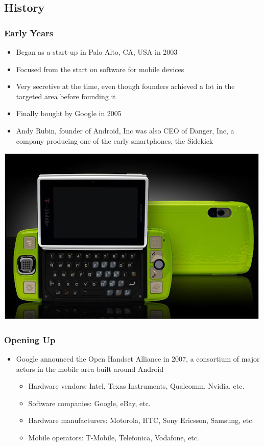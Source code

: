 \subsection{History}
\begin{frame}
  \frametitle{Early Years}
  \begin{itemize}
  \item Began as a start-up in Palo Alto, CA, USA in 2003
  \item Focused from the start on software for mobile devices
  \item Very secretive at the time, even though founders achieved a
    lot in the targeted area before founding it
  \item Finally bought by Google in 2005
  \item Andy Rubin, founder of Android, Inc was also CEO of Danger,
    Inc, a company producing one of the early smartphones, the
    Sidekick
  \end{itemize}
  \begin{center}
    \includegraphics[height=0.4\textheight]{slides/android-introduction-history/sidekick.jpg}
  \end{center}
\end{frame}

\begin{frame}
  \frametitle{Opening Up}
  \begin{itemize}
  \item Google announced the Open Handset Alliance in 2007, a
    consortium of major actors in the mobile area built around Android
    \begin{itemize}
    \item Hardware vendors: Intel, Texas Instruments, Qualcomm,
      Nvidia, etc.
    \item Software companies: Google, eBay, etc.
    \item Hardware manufacturers: Motorola, HTC, Sony Ericsson,
      Samsung, etc.
    \item Mobile operators: T-Mobile, Telefonica, Vodafone, etc.
    \end{itemize}
  \end{itemize}
\end{frame}

